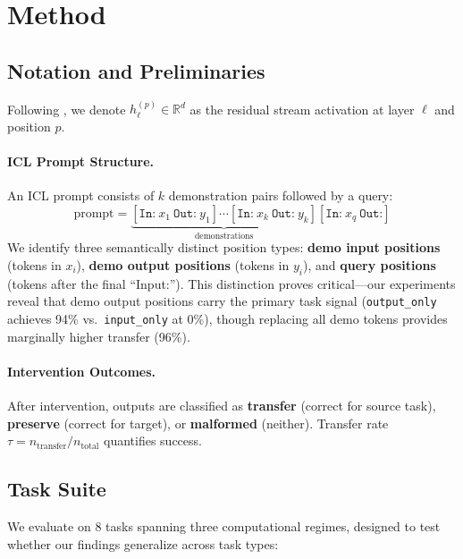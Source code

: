 \documentclass{article}
\begin{document}
\section{Method}
\label{sec:method}

\subsection{Notation and Preliminaries}

Following \citet{elhage2021mathematical}, we denote $h_\ell^{(p)} \in \mathbb{R}^d$ as the residual stream activation at layer $\ell$ and position $p$.

\paragraph{ICL Prompt Structure.} An ICL prompt consists of $k$ demonstration pairs followed by a query:
\begin{equation}
    \text{prompt} = \underbrace{[\texttt{In:}~x_1~\texttt{Out:}~y_1] \cdots [\texttt{In:}~x_k~\texttt{Out:}~y_k]}_{\text{demonstrations}} [\texttt{In:}~x_q~\texttt{Out:}]
\end{equation}
We identify three semantically distinct position types: \textbf{demo input positions} (tokens in $x_i$), \textbf{demo output positions} (tokens in $y_i$), and \textbf{query positions} (tokens after the final ``Input:''). This distinction proves critical---our experiments reveal that demo output positions carry the primary task signal (\texttt{output\_only} achieves 94\% vs.\ \texttt{input\_only} at 0\%), though replacing all demo tokens provides marginally higher transfer (96\%).

\paragraph{Intervention Outcomes.} After intervention, outputs are classified as \textbf{transfer} (correct for source task), \textbf{preserve} (correct for target), or \textbf{malformed} (neither). Transfer rate $\tau = n_{\text{transfer}} / n_{\text{total}}$ quantifies success.

\subsection{Task Suite}

We evaluate on 8 tasks spanning three computational regimes, designed to test whether our findings generalize across task types:
\end{document}
